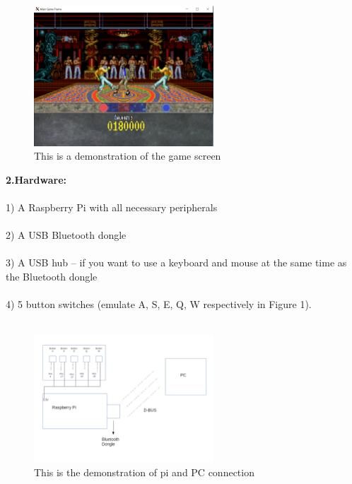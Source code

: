 \documentclass[a4paper]{article}
\begin{document}
\begin{figure}[h]
\centering
\includegraphics[width=0.6\textwidth]{game_graphics.png}
\caption{\label{fig:pi}This is a demonstration of the game screen}
\end{figure}


\setlength{\parindent}{0cm}
\textbf{2.Hardware:}\\\\
1) A Raspberry Pi with all necessary peripherals   \\\\
2) A USB Bluetooth dongle \\\\
3) A USB hub – if you want to use a keyboard and mouse at the same time as the Bluetooth dongle  \\\\
4) 5 button switches  (emulate A, S, E, Q, W respectively in Figure 1).  \\\\

\begin{figure} [h]
\centering
\includegraphics[width=0.6\textwidth]{pidemo.png}
\caption{\label{fig:pi}This is the demonstration of pi and PC connection}
\end{figure}
\end{document}
